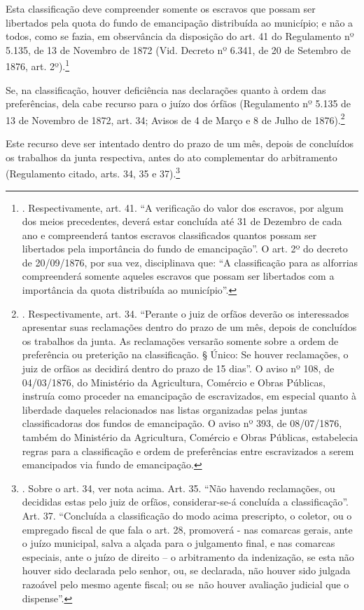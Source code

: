 Esta classificação deve compreender somente os escravos que possam ser
libertados pela quota do fundo de emancipação distribuída ao município;
e não a todos, como se fazia, em observância da disposição do art. 41 do
Regulamento nº 5.135, de 13 de Novembro de 1872 (Vid. Decreto nº 6.341,
de 20 de Setembro de 1876, art. 2º).\footnote{. Respectivamente, art.
  41. ``A verificação do valor dos escravos, por algum dos meios
  precedentes, deverá estar concluída até 31 de Dezembro de cada ano e
  compreenderá tantos escravos classificados quantos possam ser
  libertados pela importância do fundo de emancipação''. O art. 2º do
  decreto de 20/09/1876, por sua vez, disciplinava que: ``A
  classificação para as alforrias compreenderá somente aqueles escravos
  que possam ser libertados com a importância da quota distribuída ao
  município''.}

Se, na classificação, houver deficiência nas declarações quanto à ordem
das preferências, dela cabe recurso para o juízo dos órfãos (Regulamento
nº 5.135 de 13 de Novembro de 1872, art. 34; Avisos de 4 de Março e 8 de
Julho de 1876).\footnote{. Respectivamente, art. 34. ``Perante o juiz de
  orfãos deverão os interessados apresentar suas reclamações dentro do
  prazo de um mês, depois de concluídos os trabalhos da junta. As
  reclamações versarão somente sobre a ordem de preferência ou
  preterição na classificação. § Único: Se houver reclamações, o juiz de
  orfãos as decidirá dentro do prazo de 15 dias''. O aviso nº 108, de
  04/03/1876, do Ministério da Agricultura, Comércio e Obras Públicas,
  instruía como proceder na emancipação de escravizados, em especial
  quanto à liberdade daqueles relacionados nas listas organizadas pelas
  juntas classificadoras dos fundos de emancipação. O aviso nº 393, de
  08/07/1876, também do Ministério da Agricultura, Comércio e Obras
  Públicas, estabelecia regras para a classificação e ordem de
  preferências entre escravizados a serem emancipados via fundo de
  emancipação.}

Este recurso deve ser intentado dentro do prazo de um mês, depois de
concluídos os trabalhos da junta respectiva, antes do ato complementar
do arbitramento (Regulamento citado, arts. 34, 35 e 37).\footnote{.
  Sobre o art. 34, ver nota acima. Art. 35. ``Não havendo reclamações,
  ou decididas estas pelo juiz de orfãos, considerar-se-á concluída a
  classificação''. Art. 37. ``Concluída a classificação do modo acima
  prescripto, o coletor, ou o empregado fiscal de que fala o art. 28,
  promoverá - nas comarcas gerais, ante o juízo municipal, salva a
  alçada para o julgamento final, e nas comarcas especiais, ante o juízo
  de direito -- o arbitramento da indenização, se esta não houver sido
  declarada pelo senhor, ou, se declarada, não houver sido julgada
  razoável pelo mesmo agente fiscal; ou se~não houver avaliação judicial
  que o dispense''.}

